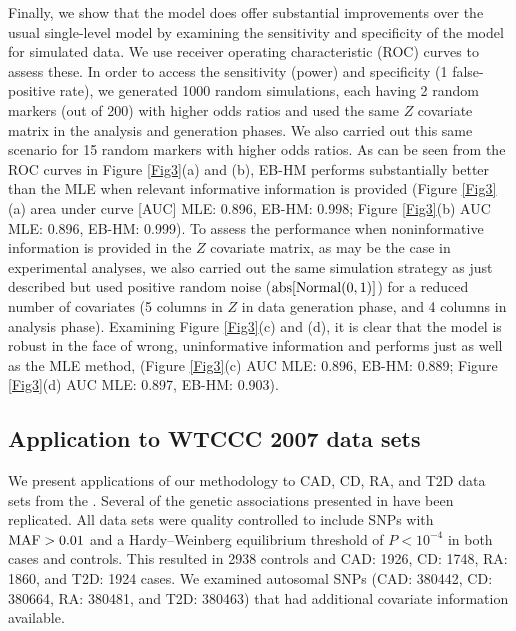 Finally, we show that the model does offer substantial
improvements over the usual single-level model by examining
the sensitivity and specificity of the model for simulated
data. We use receiver operating characteristic (ROC)
curves to assess these. In order to access the sensitivity
(power) and specificity (1 false-positive rate), we
generated 1000 random simulations, each having 2 random
markers (out of 200) with higher odds ratios and used the
same $Z$ covariate matrix in the analysis and generation
phases. We also carried out this same scenario for 15
random markers with higher odds ratios. As can be seen
from the ROC curves in Figure \ref{Fig3}(a) and (b),
EB-HM performs substantially better than the MLE when
relevant informative information is provided
(Figure \ref{Fig3}(a) area under curve [AUC] MLE: 0.896,
EB-HM: 0.998; Figure \ref{Fig3}(b) AUC MLE: 0.896,
EB-HM: 0.999). To assess the performance when
noninformative information is provided in the $Z$
covariate matrix, as may be the case in experimental
analyses, we also carried out the same simulation strategy
as just described but used positive random noise
($\hbox{abs} [ \hbox{Normal} (0, 1) ]$) for a reduced
number of covariates (5 columns in $Z$ in data generation
phase, and 4 columns in analysis phase). Examining
Figure \ref{Fig3}(c) and (d), it is clear that the model
is robust in the face of wrong, uninformative information
and performs just as well as the MLE method,
(Figure \ref{Fig3}(c) AUC MLE: 0.896, EB-HM: 0.889;
Figure \ref{Fig3}(d) AUC MLE: 0.897, EB-HM: 0.903).


\subsection{Application to WTCCC 2007 data sets}

We present applications of our methodology to CAD, CD,
RA, and T2D data sets from the
\cite{SAS_Institute:1999}.
Several of the genetic associations presented in
\citet{Brown:1989}
have been replicated. All data sets were quality controlled
to include SNPs with $\hbox{MAF} > 0.01$ and a
Hardy--Weinberg equilibrium threshold of $P < 10^{-4}$ in
both cases and controls. This resulted in 2938 controls
and CAD: 1926, CD: 1748, RA: 1860, and T2D: 1924 cases.
We examined autosomal SNPs (CAD: 380442, CD: 380664,
RA: 380481, and T2D: 380463) that had additional covariate
information available.

